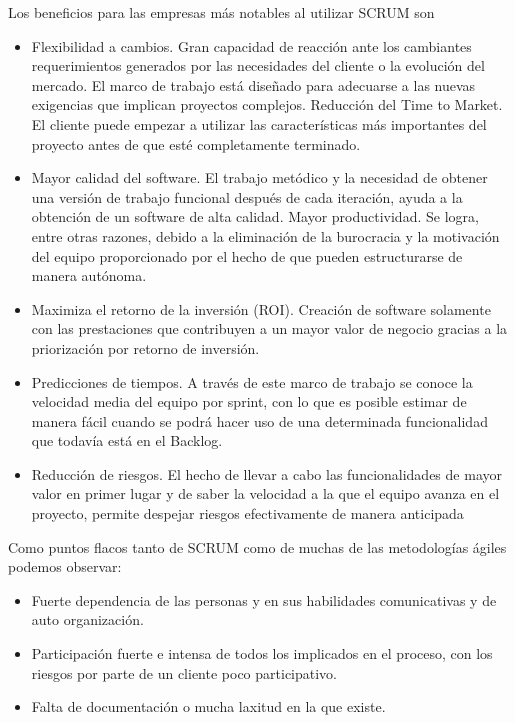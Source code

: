 \documentclass[../pfc.tex]{subfiles}
\begin{document}
	Los beneficios para las empresas más notables al utilizar SCRUM son
	
	\begin{itemize} 
		\item Flexibilidad a cambios. Gran capacidad de reacción ante los cambiantes requerimientos generados por las necesidades del cliente o la evolución del mercado. El marco de trabajo está diseñado para adecuarse a las nuevas exigencias que implican proyectos complejos.
		Reducción del Time to Market. El cliente puede empezar a utilizar las características más importantes del proyecto antes de que esté completamente terminado. 
		\item Mayor calidad del software. El trabajo metódico y la necesidad de obtener una versión de trabajo funcional después de cada iteración, ayuda a la obtención de un software de alta calidad.
		Mayor productividad. Se logra, entre otras razones, debido a la eliminación de la burocracia y la motivación del equipo proporcionado por el hecho de que pueden estructurarse de manera autónoma.
		\item Maximiza el retorno de la inversión (ROI). Creación de software solamente con las prestaciones que contribuyen a un mayor valor de negocio gracias a la priorización por retorno de inversión.
		\item Predicciones de tiempos. A través de este marco de trabajo se conoce la velocidad media del equipo por sprint, con lo que es posible estimar de manera fácil cuando se podrá hacer uso de una determinada funcionalidad que todavía está en el Backlog.
		\item Reducción de riesgos. El hecho de llevar a cabo las funcionalidades de mayor valor en primer lugar y de saber la velocidad a la que el equipo avanza en el proyecto, permite despejar riesgos efectivamente de manera anticipada
	\end{itemize}
	
	Como puntos flacos tanto de SCRUM como de muchas de las metodologías ágiles podemos observar:
	
		\begin{itemize} 
			\item Fuerte dependencia de las personas y en sus habilidades comunicativas y de auto organización.
			\item Participación fuerte e intensa de todos los implicados en el proceso, con los riesgos por parte de un cliente poco participativo.
			\item Falta de documentación o mucha laxitud en la que existe.
		\end{itemize}
	
\end{document}

